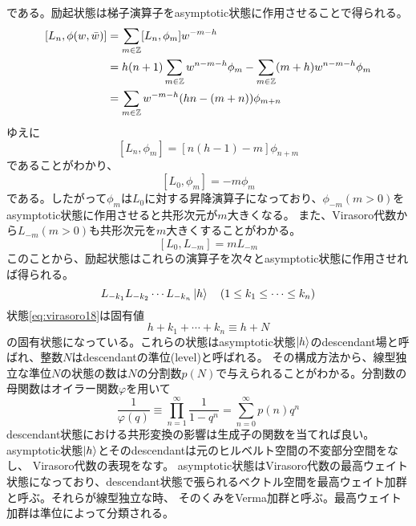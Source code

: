\documentclass[11pt, aps, longbibliography]{article}
\numberwithin{equation}{section}
\begin{document}
        である。励起状態は梯子演算子をasymptotic状態に作用させることで得られる。
        \begin{align}\label{eq:virasoro14}
            [L_n, \phi(w,\bar{w})] &= \sum_{m\in \mathbb{Z}}[L_n, \phi_{m}]w^{-m-h} \notag \\
            &= h(n+1)\sum_{m\in\mathbb{Z}}w^{n-m-h}\phi_m -\sum_{m\in \mathbb{Z}}(m+h)w^{n-m-h}\phi_m \notag \\
            &= \sum_{m\in \mathbb{Z}}w^{-m-h}(hn-(m+n))\phi_{m+n}
        \end{align}
        ゆえに
        \begin{equation}\label{eq:virasoro15}
            [L_n, \phi_m] = [n(h-1)-m]\phi_{n+m}
        \end{equation}
        であることがわかり、
        \begin{equation}\label{eq:virasoro16}
            [L_0, \phi_m] = -m\phi_{m}
        \end{equation}
        である。したがって$\phi_m$は$L_0$に対する昇降演算子になっており、$\phi_{-m} (m>0)$をasymptotic状態に作用させると共形次元が$m$大きくなる。
        また、Virasoro代数から$L_{-m} (m>0)$も共形次元を$m$大きくすることがわかる。
        \begin{equation}\label{eq:virasoro17}
            [L_0, L_{-m}] = mL_{-m}
        \end{equation}
        このことから、励起状態はこれらの演算子を次々とasymptotic状態に作用させれば得られる。
        \begin{equation}\label{eq:virasoro18}
            L_{-k_1}L_{-k_2} \cdots L_{-k_n}\ket{h} \quad (1\leq k_1 \leq \cdots \leq k_n)
        \end{equation}
        状態\eqref{eq:virasoro18}は固有値
        \begin{equation}\label{eq:virasoro19}
            h + k_1 + \cdots + k_n \equiv h + N
        \end{equation}
        の固有状態になっている。これらの状態はasymptotic状態$\ket{h}$のdescendant場と呼ばれ、整数$N$はdescendantの準位(level)と呼ばれる。
        その構成方法から、線型独立な準位$N$の状態の数は$N$の分割数$p(N)$で与えられることがわかる。分割数の母関数はオイラー関数$\varphi$を用いて
        \begin{equation}\label{eq:virasoro20}
            \frac{1}{\varphi(q)} \equiv \prod_{n=1}^{\infty} \frac{1}{1-q^n} = \sum_{n=0}^{\infty}p(n)q^n
        \end{equation}
        descendant状態における共形変換の影響は生成子の関数を当てれば良い。asymptotic状態$\ket{h}$とそのdescendantは元のヒルベルト空間の不変部分空間をなし、
        Virasoro代数の表現をなす。
        asymptotic状態はVirasoro代数の最高ウェイト状態になっており、descendant状態で張られるベクトル空間を最高ウェイト加群と呼ぶ。それらが線型独立な時、
        そのくみをVerma加群と呼ぶ。最高ウェイト加群は準位によって分類される。
\end{document}

